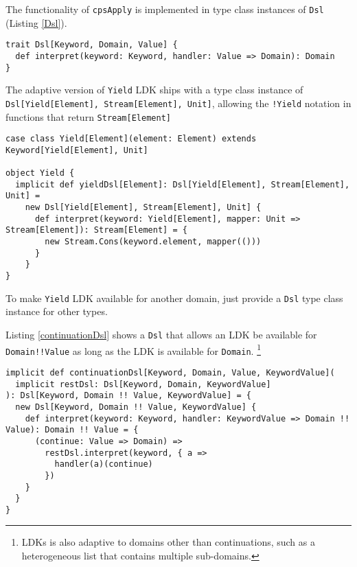 The functionality of \lstinline{cpsApply} is implemented in type class instances of \lstinline{Dsl} (Listing \ref{Dsl}).

\begin{lstlisting}[caption={The type class to interpret \lstinline{cpsApply}},label={Dsl}]
trait Dsl[Keyword, Domain, Value] {
  def interpret(keyword: Keyword, handler: Value => Domain): Domain
}
\end{lstlisting}

The adaptive version of \lstinline{Yield} LDK ships with a type class instance of \lstinline{Dsl[Yield[Element], Stream[Element], Unit]}, allowing the \lstinline{!Yield} notation in functions that return \lstinline{Stream[Element]}

\begin{lstlisting}[caption={The \lstinline{Yield} LDK, the adaptive version},label={Yield}]
case class Yield[Element](element: Element) extends Keyword[Yield[Element], Unit]

object Yield {
  implicit def yieldDsl[Element]: Dsl[Yield[Element], Stream[Element], Unit] =
    new Dsl[Yield[Element], Stream[Element], Unit] {
      def interpret(keyword: Yield[Element], mapper: Unit => Stream[Element]): Stream[Element] = {
        new Stream.Cons(keyword.element, mapper(()))
      }
    }
}
\end{lstlisting}

To make \lstinline{Yield} LDK available for another domain, just provide a \lstinline{Dsl} type class instance for other types.

Listing \ref{continuationDsl} shows a \lstinline{Dsl} that allows an LDK be available for \lstinline{Domain!!Value} as long as the LDK is available for \lstinline{Domain}.  \footnote{LDKs is also adaptive to domains other than continuations, such as a heterogeneous list that contains multiple sub-domains.}

\begin{lstlisting}[caption={The \lstinline{Yield} LDK, the adaptive version},label={continuationDsl}]
implicit def continuationDsl[Keyword, Domain, Value, KeywordValue](
  implicit restDsl: Dsl[Keyword, Domain, KeywordValue]
): Dsl[Keyword, Domain !! Value, KeywordValue] = {
  new Dsl[Keyword, Domain !! Value, KeywordValue] {
    def interpret(keyword: Keyword, handler: KeywordValue => Domain !! Value): Domain !! Value = {
      (continue: Value => Domain) =>
        restDsl.interpret(keyword, { a =>
          handler(a)(continue)
        })
    }
  }
}
\end{lstlisting}

